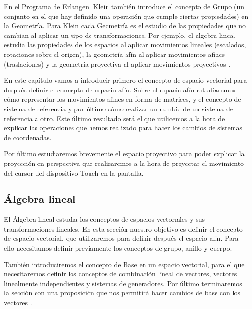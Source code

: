 \documentclass[a4paper,11pt, oneside]{book}
\begin{document}
En el Programa de Erlangen, Klein también introduce el concepto de Grupo (un conjunto en el que hay definido una operación que cumple ciertas propiedades) en la Geometría. Para Klein cada Geometría es el estudio de las propiedades que no cambian al aplicar un tipo de transformaciones. Por ejemplo, el algebra lineal estudia las propiedades de los espacios al aplicar movimientos lineales (escalados, rotaciones sobre el origen), la geometría afín al aplicar movimientos afines (traslaciones) y la geometría proyectiva al aplicar movimientos proyectivos \cite{bell}.

En este capítulo vamos a introducir primero el concepto de espacio vectorial para después definir el concepto de espacio afín. Sobre el espacio afín estudiaremos cómo representar los movimientos afines en forma de matrices, y el concepto de sistema de referencia y por último cómo realizar un cambio de un sistema de referencia a otro. Este último resultado será el que utilicemos a la hora de explicar las operaciones que hemos realizado para hacer los cambios de sistemas de coordenadas.

Por último estudiaremos brevemente el espacio proyectivo para poder explicar la proyección en perspectiva que realizaremos a la hora de proyectar el movimiento del cursor del dispositivo Touch en la pantalla.

 


\subsection{Álgebra lineal}

El Álgebra lineal estudia los conceptos de espacios vectoriales y sus transformaciones lineales. En esta sección nuestro objetivo es definir el concepto de espacio vectorial, que utilizaremos para definir después el espacio afín. Para ello necesitamos definir previamente los conceptos de grupo, anillo y cuerpo. 

También introduciremos el concepto de Base en un espacio vectorial, para el que necesitaremos definir los conceptos de combinación lineal de vectores, vectores linealmente independientes y sistemas de generadores. Por último terminaremos la sección con una proposición que nos permitirá hacer cambios de base con los vectores \cite{algebra}.
\end{document}
